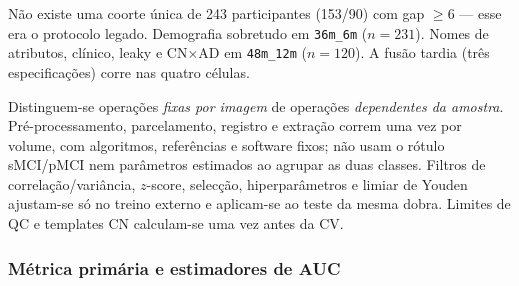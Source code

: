 \documentclass[review]{elsarticle}
\newcommand{\code}[1]{\texttt{#1}}
\begin{document}
		Não existe uma coorte única de 243 participantes (153/90) com gap $\ge 6$ --- esse era o protocolo legado.
		Demografia sobretudo em \code{36m\_6m} ($n=231$).
		Nomes de atributos, clínico, leaky e CN$\times$AD em \code{48m\_12m} ($n=120$).
		A fusão tardia (três especificações) corre nas quatro células.
		
		Distinguem-se operações \emph{fixas por imagem} de operações \emph{dependentes da amostra}.
		Pré-processamento, parcelamento, registro e extração correm uma vez por volume, com algoritmos, referências e software fixos; não usam o rótulo sMCI/pMCI nem parâmetros estimados ao agrupar as duas classes.
		Filtros de correlação/variância, $z$-score, selecção, hiperparâmetros e limiar de Youden ajustam-se só no treino externo e aplicam-se ao teste da mesma dobra.
		Limites de QC e templates CN calculam-se uma vez antes da CV.

			\subsubsection{Métrica primária e estimadores de AUC}\label{subsubsec:evaluation-metrics}
\end{document}
